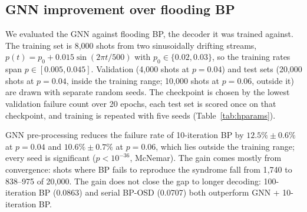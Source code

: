 \documentclass[a4paper,twocolumn,11pt,nopdfoutputerror]{quantumarticle}
\newcommand{\code}[3]{\ensuremath{[\![#1,#2,#3]\!]}}
\begin{document}
\subsection{GNN improvement over flooding BP}\label{sec:gnn_positive}

We evaluated the GNN against flooding BP, the decoder it was trained
against. The training set is 8{,}000 shots from two sinusoidally drifting
streams, $p(t)=p_0+0.015\sin(2\pi t/500)$ with $p_0\in\{0.02,0.03\}$, so
the training rates span $p\in[0.005,0.045]$. Validation (4{,}000 shots at
$p=0.04$) and test sets (20{,}000 shots at $p=0.04$, inside the training
range; 10{,}000 shots at $p=0.06$, outside it) are drawn with separate
random seeds. The checkpoint is chosen by the lowest validation failure
count over 20 epochs, each test set is scored once on that checkpoint, and
training is repeated with five seeds (Table~\ref{tab:hparams}).

\begin{table}[t]
\centering
\caption{GNN-BP vs.\ flooding BP on $\code{72}{12}{6}$, $\eta=20$, five training seeds (mean $\pm$ s.d.).
Failures follow the definition in Sec.~\ref{sec:metrics}.
95\% Wilson intervals for single decoders are $\pm0.004$ at $p=0.04$
and $\pm0.009$ at $p=0.06$.}
\label{tab:gnn_flooding}
\end{table}

GNN pre-processing reduces the failure rate of 10-iteration BP by
$12.5\%\pm0.6\%$ at $p=0.04$ and $10.6\%\pm0.7\%$ at $p=0.06$, which lies
outside the training range; every seed is significant
($p<10^{-36}$, McNemar). The gain comes mostly from convergence: shots where
BP fails to reproduce the syndrome fall from 1{,}740 to 838--975 of 20{,}000.
The gain does not close the gap to longer decoding: 100-iteration BP (0.0863)
and serial BP-OSD (0.0707) both outperform GNN + 10-iteration BP.
\end{document}

